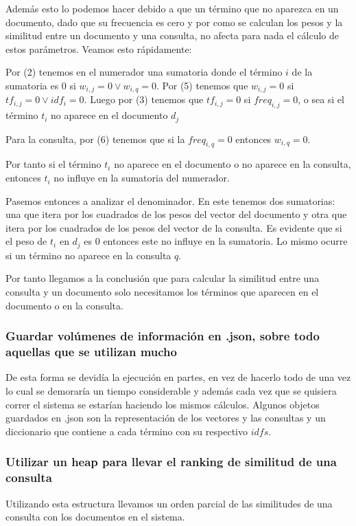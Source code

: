 \documentclass[runningheads]{llncs}
\begin{document}
	Adem\'as esto lo podemos hacer debido a que un t\'ermino que no aparezca en un documento, dado que su frecuencia es cero y por como se calculan los pesos y la similitud entre un documento y una consulta, no afecta para nada el c\'alculo de estos par\'ametros. Veamos esto r\'apidamente:
	
	Por (2) tenemos en el numerador una sumatoria donde el t\'ermino $i$ de la sumatoria es 0 si $w_{i,j}=0 \lor w_{i,q}=0$. Por (5) tenemos que $w_{i,j}=0$ si $tf_{i,j}=0 \lor idf_i=0$. Luego por (3) tenemos que $tf_{i,j}=0$ si $freq_{i,j}=0$, o sea si el t\'ermino $t_i$ no aparece en el documento $d_j$
	
	Para la consulta, por (6) tenemos que si la $freq_{i,q}=0$ entonces $w_{i,q}=0$.
	
	Por tanto si el t\'ermino $t_i$ no aparece en el documento o no aparece en la consulta, entonces $t_i$ no influye en la sumatoria del numerador.
	
	Pasemos entonces a analizar el denominador. En este tenemos dos sumatorias: una que itera por los cuadrados de los pesos del vector del documento y otra que itera por los cuadrados de los pesos del vector de la consulta. Es evidente que si el peso de $t_i$ en $d_j$ es 0 entonces este no influye en la sumatoria. Lo mismo ocurre si un t\'ermino no aparece en la consulta $q$.
	
	Por tanto llegamos a la conclusi\'on que para calcular la similitud entre una consulta y un documento solo necesitamos los t\'erminos que aparecen en el documento o en la consulta.
	
	 \subsubsection{Guardar volúmenes de informaci\'on en .json, sobre todo aquellas que se utilizan mucho} De esta forma se devid\'ia la ejecuci\'on en partes, en vez de hacerlo todo de una vez lo cual se demorar\'ia un tiempo considerable y adem\'as cada vez que se quisiera correr el sistema se estar\'ian haciendo los mismos c\'alculos. Algunos objetos guardados en .json son la representaci\'on de los vectores y las consultas y un diccionario que contiene a cada t\'ermino con su respectivo $idfs$.
	
	\subsubsection{Utilizar un heap para llevar el ranking de similitud de una consulta} Utilizando esta estructura llevamos un orden parcial de las similitudes de una consulta con los documentos en el sistema.
		
\end{document}
